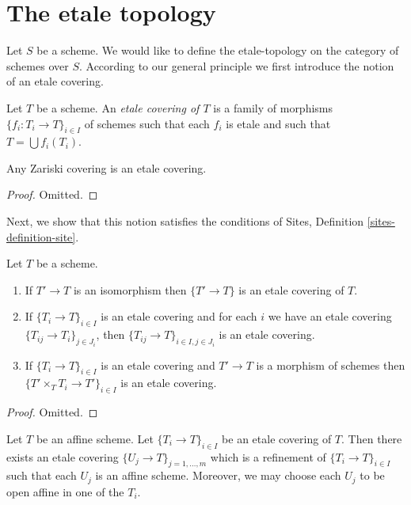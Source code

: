 \section{The etale topology}
\label{section-etale}

\noindent
Let $S$ be a scheme. We would like to define the etale-topology on
the category of schemes over $S$. According to our general principle
we first introduce the notion of an etale covering.

\begin{definition}
\label{definition-etale-covering}
Let $T$ be a scheme. An {\it etale covering of $T$} is a family
of morphisms $\{f_i : T_i \to T\}_{i \in I}$ of schemes
such that each $f_i$ is etale and such that $T = \bigcup f_i(T_i)$.
\end{definition}

\begin{lemma}
\label{lemma-zariski-etale}
Any Zariski covering is an etale covering.
\end{lemma}

\begin{proof}
Omitted.
\end{proof}

\noindent
Next, we show that this notion satisfies the conditions of
Sites, Definition \ref{sites-definition-site}.

\begin{lemma}
\label{lemma-etale}
Let $T$ be a scheme.
\begin{enumerate}
\item If $T' \to T$ is an isomorphism then $\{T' \to T\}$
is an etale covering of $T$.
\item If $\{T_i \to T\}_{i\in I}$ is an etale covering and for each
$i$ we have an etale covering $\{T_{ij} \to T_i\}_{j\in J_i}$, then
$\{T_{ij} \to T\}_{i \in I, j\in J_i}$ is an etale covering.
\item If $\{T_i \to T\}_{i\in I}$ is an etale covering
and $T' \to T$ is a morphism of schemes then
$\{T' \times_T T_i \to T'\}_{i\in I}$ is an etale covering.
\end{enumerate}
\end{lemma}

\begin{proof}
Omitted.
\end{proof}

\begin{lemma}
\label{lemma-etale-affine}
Let $T$ be an affine scheme.
Let $\{T_i \to T\}_{i \in I}$ be an etale covering of $T$.
Then there exists an etale covering
$\{U_j \to T\}_{j = 1, \ldots, m}$ which is a refinement
of $\{T_i \to T\}_{i \in I}$ such that each $U_j$ is an affine
scheme. Moreover, we may choose each $U_j$ to be open affine
in one of the $T_i$.
\end{lemma}

